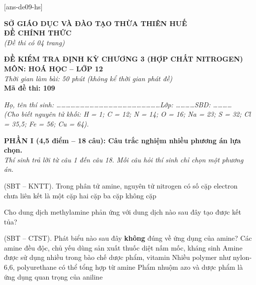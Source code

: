 \documentclass[11pt,a4paper]{article}
\def\loigiai#1{}
\begin{document}
[ans-de09-hs]

\noindent
\begin{minipage}[t]{0.48\textwidth}
	\centering
	\textbf{SỞ GIÁO DỤC VÀ ĐÀO TẠO THỪA THIÊN HUẾ}\\
	\textbf{ĐỀ CHÍNH THỨC}\\
	\textit{(Đề thi có 04 trang)}
\end{minipage}\hfill
\begin{minipage}[t]{0.48\textwidth}
	\centering
	\textbf{\color{mainGreen}ĐỀ KIỂM TRA ĐỊNH KỲ CHƯƠNG 3 (HỢP CHẤT NITROGEN)}\\
	\textbf{MÔN: HOÁ HỌC -- LỚP 12}\\
	\textit{Thời gian làm bài: 50 phút (không kể thời gian phát đề)}\\
	\textbf{Mã đề thi: 109}
\end{minipage}


\vspace{0.1cm}
\noindent\textit{Họ, tên thí sinh: \dots\dots\dots\dots\dots\dots\dots\dots\dots\dots\dots\dots\dots\dots\dots\dots\dots\dots\dots\dots\dots\dots Lớp: \dots\dots\dots\dots SBD: \dots\dots\dots\dots}\\
\noindent\textit{(Cho biết nguyên tử khối: H = 1; C = 12; N = 14; O = 16; Na = 23; S = 32; Cl = 35,5; Fe = 56; Cu = 64).}

\vspace{0.15cm}
\noindent
\textbf{PHẦN I (4,5 điểm -- 18 câu): Câu trắc nghiệm nhiều phương án lựa chọn.}\\
\textit{Thí sinh trả lời từ câu 1 đến câu 18. Mỗi câu hỏi thí sinh chỉ chọn một phương án.}

\setcounter{ex}{0}

\begin{ex}
(SBT -- KNTT). Trong phân tử amine, nguyên tử nitrogen có số cặp electron chưa liên kết là
\choice
{một cặp}
{hai cặp}
{ba cặp}
{không cặp}
\loigiai{}
\end{ex}

\begin{ex}
Cho dung dịch methylamine phản ứng với dung dịch nào sau đây tạo được kết tủa?
\choice
{}
{}
{}
{}
\loigiai{}
\end{ex}

\begin{ex}
(SBT -- CTST). Phát biểu nào sau đây \textbf{không} đúng về ứng dụng của amine?
\choice
{Các amine đều độc, chủ yếu dùng sản xuất thuốc diệt nấm mốc, kháng sinh}
{Amine được sử dụng nhiều trong bào chế dược phẩm, vitamin}
{Nhiều polymer như nylon-6,6, polyurethane có thể tổng hợp từ amine}
{Phẩm nhuộm azo và dược phẩm là ứng dụng quan trọng của aniline}
\loigiai{}
\end{ex}
\end{document}
